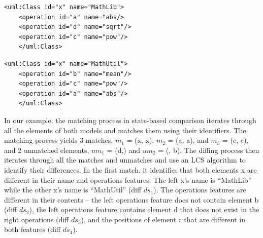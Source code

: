 \documentclass{jot}
\begin{document}
\vspace{-10pt}
\begin{minipage}[t]{0.49\linewidth} 
    \begin{lstlisting}[style=eol,caption={The simplified XMI of the left model in Fig. \ref{fig:left}.},label=lst:leftxmi]
    <uml:Class id="x" name="MathLib">
    <operation id="a" name="abs/>
    <operation id="d" name="sqrt"/>
    <operation id="c" name="pow"/>
    </uml:Class>
    \end{lstlisting}
\end{minipage}
\hfill
\begin{minipage}[t]{0.49\linewidth}
    \begin{lstlisting}[style=eol,caption={The simplified XMI of the right model in Fig. \ref{fig:right}.},label=lst:rightxmi]
    <uml:Class id="x" name="MathUtil">
    <operation id="b" name="mean"/>
    <operation id="c" name="pow"/>
    <operation id="a" name="abs"/>
    </uml:Class>
    \end{lstlisting}
\end{minipage}

In our example, the matching process in state-based comparison iterates through all the elements of both models and matches them using their identifiers. The matching process yields 3 matches, $m_1$ = (\textsf{x}, \textsf{x}), $m_2$ = (\textsf{a}, \textsf{a}), and $m_3$ = (\textsf{c}, \textsf{c}), and 2 unmatched elements, $um_1$ = (\textsf{d},) and $um_2$ = (, \textsf{b}). The diffing process then iterates through all the matches and unmatches and use an LCS algorithm to identify their differences. In the first match, it identifies that both elements \textsf{x} are different in their \textsf{name} and \textsf{operations} features. 
The left \textsf{x}'s \textsf{name} is ``MathLib'' while the other \textsf{x}'s \textsf{name} is ``MathUtil'' (diff $ds_1$). The \textsf{operations} features are different in their contents -- the left \textsf{operations} feature does not contain element \textsf{b} (diff $ds_2$), the left \textsf{operations} feature contains element \textsf{d} 
that does not exist in the right \textsf{operations} (diff $ds_3$), and the positions of element \textsf{c} that are different in both features (diff $ds_4$).
\end{document}
